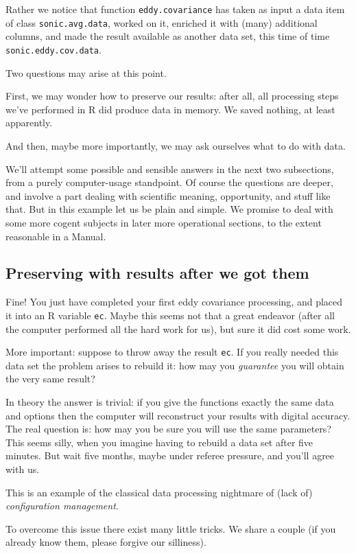 \documentclass[a4paper,10pt]{book}
\begin{document}
Rather we notice that function \verb|eddy.covariance| has taken as input a data item of class \verb|sonic.avg.data|, worked on it, enriched it with (many) additional columns, and made the result available as another data set, this time of time \verb|sonic.eddy.cov.data|.

Two questions may arise at this point.

First, we may wonder how to preserve our results: after all, all processing steps we've performed in R did produce data in memory. We saved nothing, at least apparently.

And then, maybe more importantly, we may ask ourselves what to do with data.

We'll attempt some possible and sensible answers in the next two subsections, from a purely computer-usage standpoint. Of course the questions are deeper, and involve a part dealing with scientific meaning, opportunity, and stuff like that. But in this example let us be plain and simple. We promise to deal with some more cogent subjects in later more operational sections, to the extent reasonable in a Manual.

\subsection{Preserving with results after we got them}

Fine! You just have completed your first eddy covariance processing, and placed it into an R variable \verb|ec|. Maybe this seems not that a great endeavor (after all the computer performed all the hard work for us), but sure it did cost some work.

More important: suppose to throw away the result \verb|ec|. If you really needed this data set the problem arises to rebuild it: how may you \emph{guarantee} you will obtain the very same result?

In theory the answer is trivial: if you give the functions exactly the same data and options then the computer will reconstruct your results with digital accuracy. The real question is: how may you be sure you will use the same parameters? This seems silly, when you imagine having to rebuild a data set after five minutes. But wait five months, maybe under referee pressure, and you'll agree with us.

This is an example of the classical data processing nightmare of (lack of) \emph{configuration management}.

To overcome this issue there exist many little tricks. We share a couple (if you already know them, please forgive our silliness).
\end{document}
